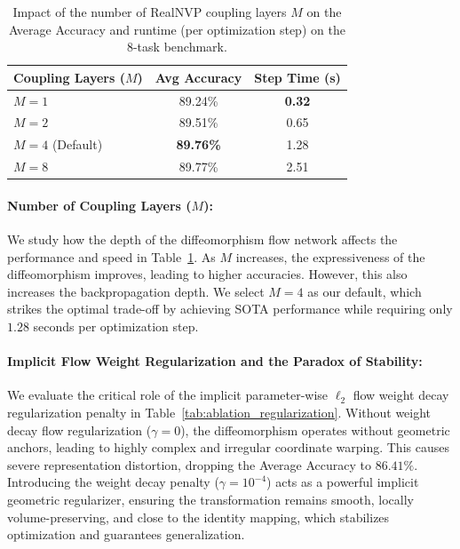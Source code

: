 \begin{table}[h]
\caption{Impact of the number of RealNVP coupling layers $M$ on the Average Accuracy and runtime (per optimization step) on the 8-task benchmark.}
\label{tab:ablation_layers}
\vskip 0.15in
\begin{center}
\begin{small}
\begin{sc}
\begin{tabular}{lcc}
\toprule
Coupling Layers ($M$) & Avg Accuracy & Step Time (s) \\
\midrule
$M=1$ & 89.24\% & \textbf{0.32} \\
$M=2$ & 89.51\% & 0.65 \\
$M=4$ (Default) & \textbf{89.76\%} & 1.28 \\
$M=8$ & 89.77\% & 2.51 \\
\bottomrule
\end{tabular}
\end{sc}
\end{small}
\end{center}
\vskip -0.1in
\end{table}

\paragraph{Number of Coupling Layers ($M$):}
We study how the depth of the diffeomorphism flow network affects the performance and speed in Table~\ref{tab:ablation_layers}. 
As $M$ increases, the expressiveness of the diffeomorphism improves, leading to higher accuracies. 
However, this also increases the backpropagation depth. 
We select $M=4$ as our default, which strikes the optimal trade-off by achieving SOTA performance while requiring only $1.28$ seconds per optimization step.

\paragraph{Implicit Flow Weight Regularization and the Paradox of Stability:}
We evaluate the critical role of the implicit parameter-wise $\ell_2$ flow weight decay regularization penalty in Table~\ref{tab:ablation_regularization}. 
Without weight decay flow regularization ($\gamma = 0$), the diffeomorphism operates without geometric anchors, leading to highly complex and irregular coordinate warping. 
This causes severe representation distortion, dropping the Average Accuracy to $86.41\%$. 
Introducing the weight decay penalty ($\gamma = 10^{-4}$) acts as a powerful implicit geometric regularizer, ensuring the transformation remains smooth, locally volume-preserving, and close to the identity mapping, which stabilizes optimization and guarantees generalization.

